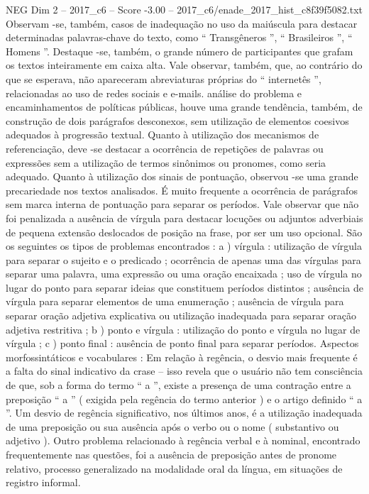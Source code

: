 \begin{textsample}{NEG Dim 2 – 2017\_c6 – Score -3.00 – 2017\_c6/enade\_2017\_hist\_c8f39f5082.txt}
Observam -se, também, casos de inadequação no uso da maiúscula para destacar determinadas palavras-chave do texto, como “ Transgêneros ”, “ Brasileiros ”, “ Homens ”.
Destaque -se, também, o grande número de participantes que grafam os textos inteiramente em caixa alta.
Vale observar, também, que, ao contrário do que se esperava, não apareceram abreviaturas próprias do “ internetês ”, relacionadas ao uso de redes sociais e e-mails. análise do problema e encaminhamentos de políticas públicas, houve uma grande tendência, também, de construção de dois parágrafos desconexos, sem utilização de elementos coesivos adequados à progressão textual.
Quanto à utilização dos mecanismos de referenciação, deve -se destacar a ocorrência de repetições de palavras ou expressões sem a utilização de termos sinônimos ou pronomes, como seria adequado.
Quanto à utilização dos sinais de pontuação, observou -se uma grande precariedade nos textos analisados.
É muito frequente a ocorrência de parágrafos sem marca interna de pontuação para separar os períodos.
Vale observar que não foi penalizada a ausência de vírgula para destacar locuções ou adjuntos adverbiais de pequena extensão deslocados de posição na frase, por ser um uso opcional.
São os seguintes os tipos de problemas encontrados : a ) vírgula : utilização de vírgula para separar o sujeito e o predicado ; ocorrência de apenas uma das vírgulas para separar uma palavra, uma expressão ou uma oração encaixada ; uso de vírgula no lugar do ponto para separar ideias que constituem períodos distintos ; ausência de vírgula para separar elementos de uma enumeração ; ausência de vírgula para separar oração adjetiva explicativa ou utilização inadequada para separar oração adjetiva restritiva ; b ) ponto e vírgula : utilização do ponto e vírgula no lugar de vírgula ; c ) ponto final : ausência de ponto final para separar períodos.
Aspectos morfossintáticos e vocabulares : Em relação à regência, o desvio mais frequente é a falta do sinal indicativo da crase – isso revela que o usuário não tem consciência de que, sob a forma do termo “ a ”, existe a presença de uma contração entre a preposição “ a ” ( exigida pela regência do termo anterior ) e o artigo definido “ a ”.
Um desvio de regência significativo, nos últimos anos, é a utilização inadequada de uma preposição ou sua ausência após o verbo ou o nome ( substantivo ou adjetivo ).
Outro problema relacionado à regência verbal e à nominal, encontrado frequentemente nas questões, foi a ausência de preposição antes de pronome relativo, processo generalizado na modalidade oral da língua, em situações de registro informal.

\end{textsample}
